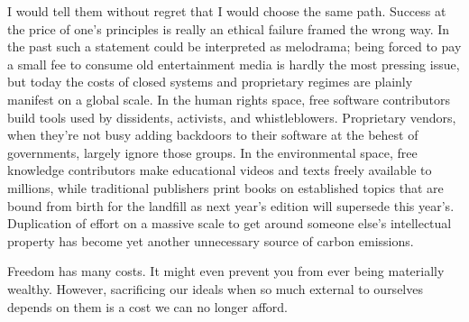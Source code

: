 I would tell them without regret that I would choose the same path.
Success at the price of one's principles is really an ethical failure
framed the wrong way. In the past such a statement could be interpreted
as melodrama; being forced to pay a small fee to consume old
entertainment media is hardly the most pressing issue, but today the
costs of closed systems and proprietary regimes are plainly manifest on
a global scale. In the human rights space, free software contributors
build tools used by dissidents, activists, and whistleblowers.
Proprietary vendors, when they're not busy adding backdoors to their
software at the behest of governments, largely ignore those groups. In
the environmental space, free knowledge contributors make educational
videos and texts freely available to millions, while traditional
publishers print books on established topics that are bound from birth
for the landfill as next year's edition will supersede this year's.
Duplication of effort on a massive scale to get around someone else's
intellectual property has become yet another unnecessary source of
carbon emissions.

Freedom has many costs. It might even prevent you from ever being
materially wealthy. However, sacrificing our ideals when so much
external to ourselves depends on them is a cost we can no longer afford.

